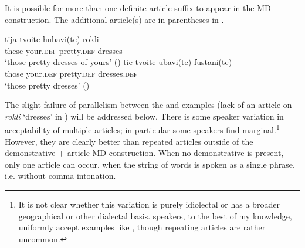 \documentclass[output=paper]{langscibook}
\begin{document}
\noindent It is possible for more than one definite article suffix to appear in the MD construction. The additional article(s) are in parentheses in .


    \largerpage

\ea \label{dresses2}
\ea \label{dresses2b}
\gll tija 	tvoite	hubavi(te) 	rokli\\
these 	your.\textsc{def}	pretty.\textsc{def}	dresses \\
\glt ‘those pretty dresses of yours’ \hfill()
\ex \label{dresses2m}
\gll tie 	tvoite ubavi(te)	fustani(te) \\
those your.\textsc{def}	pretty.\textsc{def} 	dresses.\textsc{def} \\
\glt‘those pretty dresses’ \hfill()
\z
\z

\noindent The slight failure of parallelism between the  and  examples (lack of an article on \textit{rokli} `dresses' in ) will be addressed below. There is some speaker variation in acceptability of multiple articles; in particular some  speakers find  marginal.\footnote{It is not clear whether this variation is purely idiolectal or has a broader geographical or other dialectal basis.  speakers, to the best of my knowledge, uniformly accept examples like , though repeating articles are rather uncommon.} However, they are clearly better than repeated articles outside of the demonstrative $+$ article MD construction. When no demonstrative is present, only one article can occur, when the string of words is spoken as a single phrase, i.e. without comma intonation.

\end{document}
